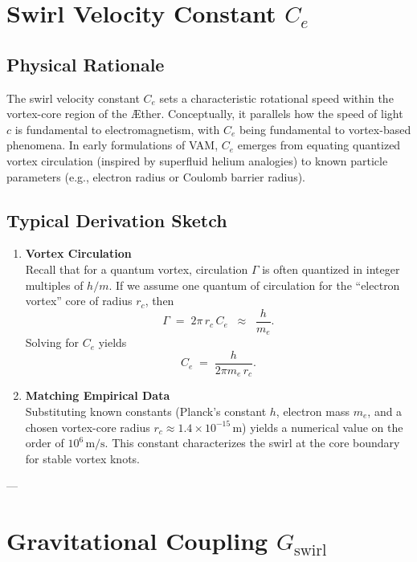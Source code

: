 \section{Swirl Velocity Constant \(C_e\)}

\subsection{Physical Rationale}
The swirl velocity constant \(C_e\) sets a characteristic rotational speed within the vortex-core region of the Æther. Conceptually, it parallels how the speed of light \(c\) is fundamental to electromagnetism, with \(C_e\) being fundamental to vortex-based phenomena. In early formulations of VAM, \(C_e\) emerges from equating quantized vortex circulation (inspired by superfluid helium analogies) to known particle parameters (e.g., electron radius or Coulomb barrier radius).

\subsection{Typical Derivation Sketch}
\begin{enumerate}
    \item \textbf{Vortex Circulation} \\
    Recall that for a quantum vortex, circulation \(\Gamma\) is often quantized in integer multiples of \(h/m\). If we assume one quantum of circulation for the “electron vortex” core of radius \(r_c\), then
    \[
        \Gamma \;=\; 2 \pi \,r_c \,C_e \;\;\approx\;\; \frac{h}{m_e}.
    \]
    Solving for \(C_e\) yields
    \[
        C_e
        \;=\;
        \frac{h}{2 \pi m_e \,r_c}.
    \]

    \item \textbf{Matching Empirical Data} \\
    Substituting known constants (Planck’s constant \(h\), electron mass \(m_e\), and a chosen vortex-core radius \(r_c\approx 1.4\times 10^{-15}\,\mathrm{m}\)) yields a numerical value on the order of \(10^6\,\mathrm{m/s}\). This constant characterizes the swirl at the core boundary for stable vortex knots.
\end{enumerate}

---

\section{Gravitational Coupling \(G_{\text{swirl}}\)}


